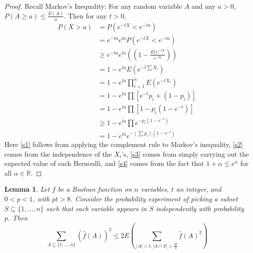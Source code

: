 \documentclass{article}
\theoremstyle{definition}
\theoremstyle{plain}
\theoremstyle{theorem}
\newtheorem{lemma}{Lemma}[section]
\begin{document}
\begin{proof}
	Recall Markov's Inequality: For any random variable $A$ and any $a>0$, $P(A \geq a) \leq \frac{E(A)}{a}$. Then for any $t > 0$,
	\begin{align*}
		P(X > a) &= P(e^{-tX} < e^{-ta}) \\
		&= e^{-ta}e^{ta}P(e^{-tX} < e^{-ta}) \\
		&\geq e^{-ta}e^{ta}\left( (1-\frac{E(e^{-tX}}{e^{-ta}}) \right) \label{s1}\tag{1} \\
		&= 1-e^{ta}E(e^{-t\sum X_i}) \\
		&= 1-e^{ta}\prod_{i=1}^nE(e^{-tX_i}) \label{s2}\tag{2} \\
		&= 1-e^{ta}\prod[e^{-t}p_i + (1-p_i)] \label{s3}\tag{3} \\
		&= 1-e^{ta}\prod[1-p_i(1-e^{-t})] \\
		&\geq 1-e^{ta}\prod e^{-p_i(1-e^{-t})} \label{s4}\tag{4} \\
		&= 1-e^{ta}e^{-(\sum p_i)(1-e^{-t})}
	\end{align*}
	Here \eqref{s1} follows from applying the complement rule to Markov's inequality, \eqref{s2} comes from the independence of the $X_i$'s, \eqref{s3} comes from simply carrying out the expected value of each Bernoulli, and \eqref{s4} comes from the fact that $1+\alpha \leq e^{\alpha}$ for all $\alpha \in \mathbb{R}$. 
\end{proof}
\begin{lemma}
	Let $f$ be a Boolean function on $n$ variables, $t$ an integer, and $0 < p < 1$, with $pt > 8$. Consider the probability experiment of picking a subset $S \subseteq \{1,\ldots,n\}$ such that each variable appears in $S$ independently with probability $p$. Then 
	\[ \sum_{A \subseteq \{1,\ldots,n\}} (\hat{f}(A))^2 \leq 2E\left( \sum_{ |A| > t, |A \cap S| > \frac{pt}{2}} \hat{f}(A)^2 \right) \]
\end{lemma}
\end{document}

